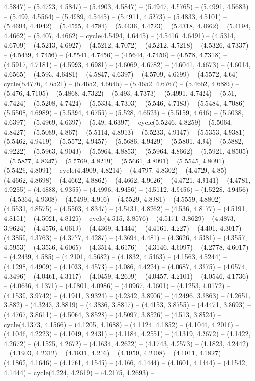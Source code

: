 4.5847) -- (5.4723, 4.5847) -- (5.4903, 4.5847) -- (5.4947, 4.5765) -- (5.4991, 4.5683) -- (5.499, 4.5564) -- (5.4989, 4.5445) -- (5.4911, 4.5273) -- (5.4833, 4.5101) -- (5.4694, 4.4942) -- (5.4555, 4.4784) -- (5.4436, 4.4723) -- (5.4318, 4.4662) -- (5.4194, 4.4662) -- (5.407, 4.4662) -- cycle(4.5494, 4.6445) -- (4.5416, 4.6491) -- (4.5314, 4.6709) -- (4.5213, 4.6927) -- (4.5212, 4.7072) -- (4.5212, 4.7218) -- (4.5326, 4.7337) -- (4.5439, 4.7456) -- (4.5541, 4.7456) -- (4.5644, 4.7456) -- (4.578, 4.7318) -- (4.5917, 4.7181) -- (4.5993, 4.6981) -- (4.6069, 4.6782) -- (4.6041, 4.6673) -- (4.6014, 4.6565) -- (4.593, 4.6481) -- (4.5847, 4.6397) -- (4.5709, 4.6399) -- (4.5572, 4.64) -- cycle(5.4776, 4.6521) -- (5.4652, 4.6645) -- (5.4652, 4.6767) -- (5.4652, 4.6889) -- (5.476, 4.7105) -- (5.4868, 4.7322) -- (5.493, 4.7373) -- (5.4991, 4.7424) -- (5.51, 4.7424) -- (5.5208, 4.7424) -- (5.5334, 4.7303) -- (5.546, 4.7183) -- (5.5484, 4.7086) -- (5.5508, 4.6989) -- (5.5394, 4.6756) -- (5.528, 4.6523) -- (5.5159, 4.646) -- (5.5038, 4.6397) -- (5.4969, 4.6397) -- (5.49, 4.6397) -- cycle(5.5246, 4.8259) -- (5.5064, 4.8427) -- (5.5089, 4.867) -- (5.5114, 4.8913) -- (5.5233, 4.9147) -- (5.5353, 4.9381) -- (5.5462, 4.9419) -- (5.5572, 4.9457) -- (5.5686, 4.9429) -- (5.5801, 4.94) -- (5.5882, 4.9222) -- (5.5963, 4.9043) -- (5.5964, 4.8853) -- (5.5964, 4.8662) -- (5.5921, 4.8505) -- (5.5877, 4.8347) -- (5.5769, 4.8219) -- (5.5661, 4.8091) -- (5.5545, 4.8091) -- (5.5429, 4.8091) -- cycle(4.4909, 4.8214) -- (4.4797, 4.8302) -- (4.4729, 4.85) -- (4.4662, 4.8698) -- (4.4662, 4.8862) -- (4.4662, 4.9026) -- (4.4721, 4.9141) -- (4.4781, 4.9255) -- (4.4888, 4.9355) -- (4.4996, 4.9456) -- (4.5112, 4.9456) -- (4.5228, 4.9456) -- (4.5364, 4.9308) -- (4.5499, 4.916) -- (4.5529, 4.8981) -- (4.5559, 4.8802) -- (4.5531, 4.8575) -- (4.5503, 4.8347) -- (4.5431, 4.8262) -- (4.536, 4.8177) -- (4.5191, 4.8151) -- (4.5021, 4.8126) -- cycle(4.515, 3.8576) -- (4.5171, 3.8629) -- (4.4873, 3.9624) -- (4.4576, 4.0619) -- (4.4369, 4.1444) -- (4.4161, 4.227) -- (4.401, 4.3017) -- (4.3859, 4.3763) -- (4.3777, 4.4287) -- (4.3694, 4.481) -- (4.3626, 4.5381) -- (4.3557, 4.5953) -- (4.3536, 4.6065) -- (4.3514, 4.6176) -- (4.3146, 4.6097) -- (4.2778, 4.6017) -- (4.2439, 4.585) -- (4.2101, 4.5682) -- (4.1832, 4.5463) -- (4.1563, 4.5244) -- (4.1298, 4.4909) -- (4.1033, 4.4573) -- (4.086, 4.4224) -- (4.0687, 4.3875) -- (4.0574, 4.3496) -- (4.0461, 4.3117) -- (4.0459, 4.2609) -- (4.0457, 4.2101) -- (4.0546, 4.1736) -- (4.0636, 4.1371) -- (4.0801, 4.0986) -- (4.0967, 4.0601) -- (4.1253, 4.0172) -- (4.1539, 3.9742) -- (4.1941, 3.9324) -- (4.2342, 3.8906) -- (4.2496, 3.8863) -- (4.2651, 3.882) -- (4.3243, 3.8819) -- (4.3836, 3.8817) -- (4.4153, 3.8755) -- (4.4471, 3.8693) -- (4.4767, 3.8611) -- (4.5064, 3.8528) -- (4.5097, 3.8526) -- (4.513, 3.8524) -- cycle(4.1373, 4.1566) -- (4.1205, 4.1688) -- (4.1124, 4.1852) -- (4.1044, 4.2016) -- (4.1046, 4.2223) -- (4.1049, 4.2431) -- (4.1184, 4.2551) -- (4.1319, 4.2672) -- (4.1422, 4.2672) -- (4.1525, 4.2672) -- (4.1634, 4.2622) -- (4.1743, 4.2573) -- (4.1823, 4.2442) -- (4.1903, 4.2312) -- (4.1931, 4.216) -- (4.1959, 4.2008) -- (4.1911, 4.1827) -- (4.1862, 4.1646) -- (4.1761, 4.1545) -- (4.166, 4.1444) -- (4.1601, 4.1444) -- (4.1542, 4.1444) -- cycle(4.224, 4.2619) -- (4.2175, 4.2693) -- 